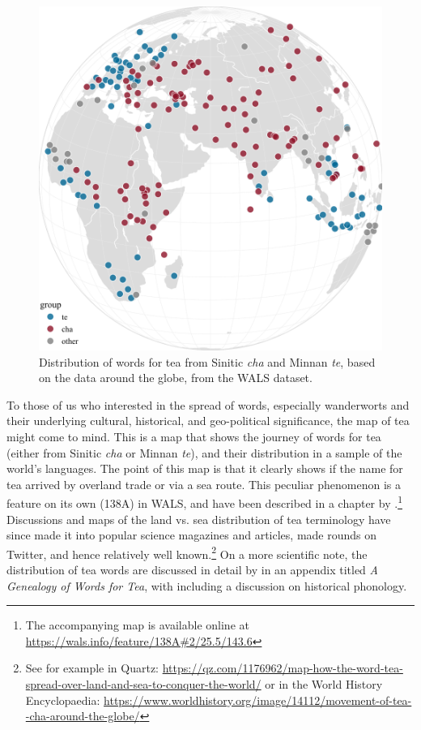 \begin{figure}[ht!]
    \centering
    \includegraphics[width=\linewidth]{imgs/plots/distribution_tea.pdf}
    \caption[Distribution of words for tea from Sinitic \textit{cha} and Minnan \textit{te}.]{Distribution of words for tea from Sinitic \textit{cha} and Minnan \textit{te}, based on the data around the globe, from the \gls{WALS} dataset.}
    \label{fig:distribution_tea}
\end{figure}

To those of us who interested in the spread of words, especially \glspl{wanderwort} and their underlying cultural, historical, and geo-political significance, the map of tea might come to mind. This is a map that shows the journey of words for tea (either from Sinitic \textit{cha} or Minnan \textit{te}), and their distribution in a sample of the world's languages. The point of this map is that it clearly shows if the name for tea arrived by overland trade or via a sea route. This peculiar phenomenon is a feature on its own (138A) in \gls{WALS}, and have been described in a chapter by \textcite{dahl_tea_2013}.\footnote{The accompanying map is available online at \url{https://wals.info/feature/138A\#2/25.5/143.6}} Discussions and maps of the land vs. sea distribution of tea terminology have since made it into popular science magazines and articles, made rounds on Twitter, and hence relatively well known.\footnote{See for example \textcite{sonnad_tea_2018} in Quartz: \url{https://qz.com/1176962/map-how-the-word-tea-spread-over-land-and-sea-to-conquer-the-world/} or \textcite{netchev_movement_2022} in the World History Encyclopaedia: \url{https://www.worldhistory.org/image/14112/movement-of-tea--cha-around-the-globe/}} On a more scientific note, the distribution of tea words are discussed in detail by \autocite[261-270]{mair_true_2009} in an appendix titled \textit{A Genealogy of Words for Tea}, with including a discussion on historical phonology.

